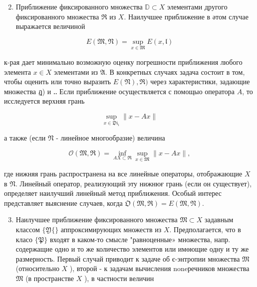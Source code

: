 \documentclass[10pt]{article}
\begin{document}
\begin{enumerate}

  \setcounter{enumi}{1}

  \item Приближение фиксированного множества $\mathbb{D} \subset X$ элементами другого фиксированного множества $\mathfrak{R}$ из $X$. Наилучшее приближение в әтом случае выражается величиной

\end{enumerate}



\[

E(\mathfrak{M}, \mathfrak{N})=\sup _{x \in \mathfrak{M}} E(x, \mathfrak{l})

\]



к-рая дает минимально возможную оценку погрешности приближения любого элемента $x \in X$ элементами из $\mathfrak{A}$. В конкретных случаях задача состоит в том, чтобы оценить или точно выразить $E(\mathfrak{N}), \Re)$ через характеристики, задающие множества ฏ) и ‥ Если приближение осуществляется с помощыо оператора $A$, то исследуется верхняя грань



\[

\sup _{x \in \mathfrak{D i}_{i}}\|x-A x\|

\]



а также (если $\mathfrak{N}$ - линейное многообразие) величина



\[

\mathscr{O}(\mathfrak{M}, \mathfrak{\Re})=\inf _{A X \subset \mathfrak{R}} \sup _{x \in \mathfrak{M}}\|x-A x\|,

\]



где нижняя грань распространена на все линейные операторы, отображающие $X$ в $\mathfrak{N}$. Линейный оператор, реализующий эту нижнюғ грань (если он существует), определяет наилучший линейный метод приближения. Особый интерес представляет выяснение случаев, когда $\mathfrak{O}(\mathfrak{M}, \mathfrak{R})=E(\mathfrak{M}, \mathfrak{N})$.



\begin{enumerate}

  \setcounter{enumi}{2}

  \item Наилучшее приближение фиксированного множества $\mathfrak{M} \subset X$ задавным классом $\{\mathfrak{Y}\{\}$ аппроксимирующих множеств из $X$. Предполагается, что в класо $\{\mathfrak{P}\}$ входят в каком-то смысле "равноценные» множества, напр. содержащие одно и то же количество элементов или имөющие одну и ту же размерность. Первый случай приводит к задаче об є-энтропии множества $\mathfrak{M}$ (относительно $X$ ), второй - к задачам вычисления noneречников множества $\mathfrak{M}$ (в пространстве $X$ ), в частности величин

\end{enumerate}
\end{document}

